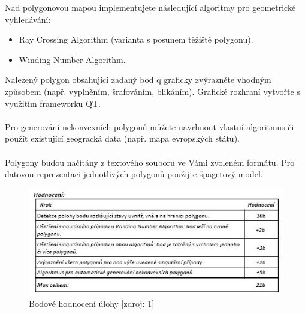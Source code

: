 \documentclass[a4paper, 12pt]{article}
\begin{document}
Nad polygonovou mapou implementujete následující algoritmy pro geometrické vyhledávání:
\begin{itemize}
  \item Ray Crossing Algorithm (varianta s posunem těžiště polygonu).
  \item Winding Number Algorithm.
\end{itemize}

Nalezený polygon obsahující zadaný bod q graficky zvýrazněte vhodným způsobem (např. vyplněním, šrafováním, blikáním). Grafické rozhraní vytvořte s využitím frameworku QT.\\
\\
Pro generování nekonvexních polygonů můžete navrhnout vlastní algoritmus či použít existující
geogracká data (např. mapa evropských států).\\
\\
Polygony budou načítány z textového souboru ve Vámi zvoleném formátu. Pro datovou reprezentaci jednotlivých polygonů použijte špagetový model.

\begin{figure}[h!]
	\centering
	\includegraphics[width=16cm]{hodnoceni.jpg}
	\caption{Bodové hodnocení úlohy [zdroj: 1]}
\end{figure}

\clearpage
\end{document}
